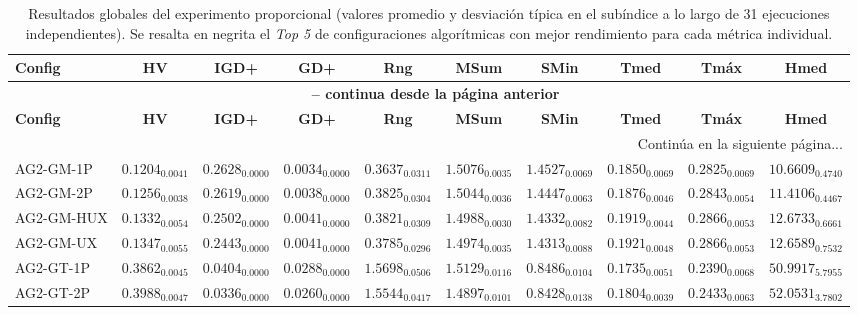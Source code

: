 \begingroup
\tiny
\setlength{\tabcolsep}{0.5pt}
\begin{longtable}{@{}lccccccccc@{}}
\caption[Resultados de las métricas de evaluación (Proporcional)]{Resultados globales del experimento proporcional (valores promedio y desviación típica en el subíndice a lo largo de 31 ejecuciones independientes). Se resalta en negrita el \textit{Top 5} de configuraciones algorítmicas con mejor rendimiento para cada métrica individual.}
\label{tab:resultados_metricas_prop} \\
\toprule
\textbf{Config} & \textbf{HV} & \textbf{IGD+} & \textbf{GD+} & \textbf{Rng} & \textbf{MSum} & \textbf{SMin} & \textbf{Tmed} & \textbf{Tmáx} & \textbf{Hmed} \\
\midrule
\endfirsthead
\multicolumn{10}{c}{{\bfseries \tablename\ \thetable{} -- continua desde la página anterior}} \\
\toprule
\textbf{Config} & \textbf{HV} & \textbf{IGD+} & \textbf{GD+} & \textbf{Rng} & \textbf{MSum} & \textbf{SMin} & \textbf{Tmed} & \textbf{Tmáx} & \textbf{Hmed} \\
\midrule
\endhead
\midrule \multicolumn{10}{r}{{Continúa en la siguiente página...}} \\
\endfoot
\bottomrule
\endlastfoot
AG2-GM-1P & $0.1204_{0.0041}$ & $0.2628_{0.0000}$ & $0.0034_{0.0000}$ & $0.3637_{0.0311}$ & $1.5076_{0.0035}$ & $1.4527_{0.0069}$ & $0.1850_{0.0069}$ & $0.2825_{0.0069}$ & $10.6609_{0.4740}$ \\
AG2-GM-2P & $0.1256_{0.0038}$ & $0.2619_{0.0000}$ & $0.0038_{0.0000}$ & $0.3825_{0.0304}$ & $1.5044_{0.0036}$ & $1.4447_{0.0063}$ & $0.1876_{0.0046}$ & $\mathbf{0.2843}_{0.0054}$ & $11.4106_{0.4467}$ \\
AG2-GM-HUX & $0.1332_{0.0054}$ & $0.2502_{0.0000}$ & $0.0041_{0.0000}$ & $0.3821_{0.0309}$ & $1.4988_{0.0030}$ & $1.4332_{0.0082}$ & $0.1919_{0.0044}$ & $\mathbf{0.2866}_{0.0053}$ & $12.6733_{0.6661}$ \\
AG2-GM-UX & $0.1347_{0.0055}$ & $0.2443_{0.0000}$ & $0.0041_{0.0000}$ & $0.3785_{0.0296}$ & $1.4974_{0.0035}$ & $1.4313_{0.0088}$ & $0.1921_{0.0048}$ & $\mathbf{0.2866}_{0.0053}$ & $12.6589_{0.7532}$ \\
AG2-GT-1P & $0.3862_{0.0045}$ & $0.0404_{0.0000}$ & $0.0288_{0.0000}$ & $\mathbf{1.5698}_{0.0506}$ & $1.5129_{0.0116}$ & $0.8486_{0.0104}$ & $0.1735_{0.0051}$ & $0.2390_{0.0068}$ & $50.9917_{5.7955}$ \\
AG2-GT-2P & $\mathbf{0.3988}_{0.0047}$ & $\mathbf{0.0336}_{0.0000}$ & $0.0260_{0.0000}$ & $1.5544_{0.0417}$ & $1.4897_{0.0101}$ & $\mathbf{0.8428}_{0.0138}$ & $0.1804_{0.0039}$ & $0.2433_{0.0063}$ & $52.0531_{3.7802}$ \\

\end{longtable}
